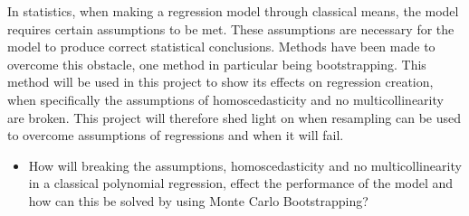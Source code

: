 In statistics, when making a regression model through classical means, the model requires certain assumptions to be met. These assumptions are necessary for the model to produce correct statistical conclusions. Methods have been made to overcome this obstacle, one method in particular being bootstrapping. This method will be used in this project to show its effects on regression creation, when specifically the assumptions of homoscedasticity and no multicollinearity are broken. This project will therefore shed light on when resampling can be used to overcome assumptions of regressions and when it will fail.

\begin{itemize}
	\item How will breaking the assumptions, homoscedasticity and no multicollinearity in a classical polynomial regression, effect the performance of the model and how can this be solved by using Monte Carlo Bootstrapping?
\end{itemize}